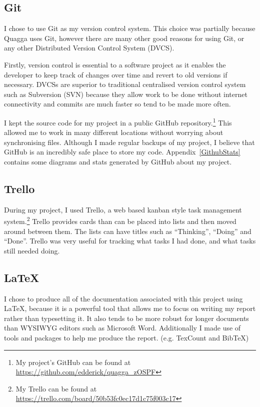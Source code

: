 \documentclass[12pt,a4paper,twoside]{report}
\begin{document}
\subsection{Git}
I chose to use Git as my version control system. This choice was
partially because Quagga uses Git, however there are many other good reasons for
using Git, or any other Distributed Version Control System (DVCS).

Firstly, version control is essential to a software project as it enables the
developer to keep track of changes over time and revert to old versions if
necessary. DVCSs are superior to traditional centralised version control
system such as Subversion (SVN) because they allow work to be done without internet
connectivity and commits are much faster so tend to be made more often. 

I kept the source code for my project in a public GitHub repository.\footnote{My
project's GitHub can be found at
\url{https://github.com/edderick/quagga\_zOSPF}} This allowed me to work in
many different locations without worrying about synchronising files. Although
I made regular backups of my project, I believe that GitHub is an incredibly
safe place to store my code. Appendix~\ref{GithubStats} contains some
diagrams and stats generated by GitHub about my project. 

\subsection{Trello}
During my project, I used Trello, a web based kanban style task
management system.\footnote{My Trello can be found at
\url{https://trello.com/board/50b53fc0ec17d1c75f003c17}}
Trello provides cards than can be placed into lists and then moved around
between them. The lists can have titles such as ``Thinking'', ``Doing'' and
``Done''. Trello was very useful for tracking what tasks I had done, and what
tasks still needed doing. 

\subsection{\LaTeX}
I chose to produce all of the documentation associated with this project using
\LaTeX, because it is a powerful tool that allows me to focus on writing my
report rather than typesetting it. It also tends to be more robust for longer
documents than WYSIWYG editors such as Microsoft Word. Additionally I made use
of tools and packages to help me produce the report. (e.g. TexCount and BibTeX)
\end{document}
